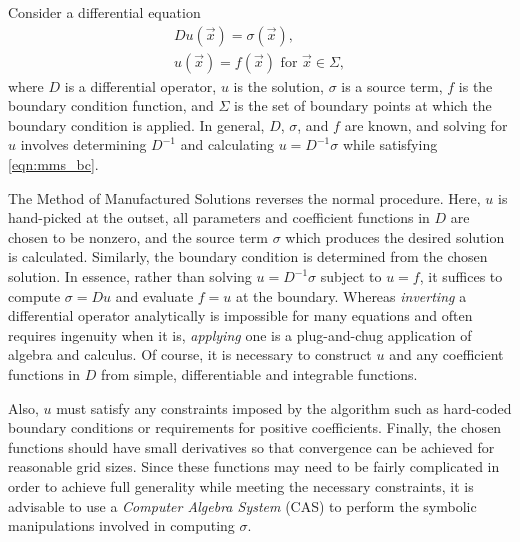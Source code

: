 Consider a differential equation
\begin{align}
  Du(\vec{x}) = \sigma(\vec{x}), \label{eqn:mms_de} \\
  u(\vec{x})=f(\vec{x}) \mbox{ for } \vec{x} \in \Sigma,
  \label{eqn:mms_bc}
\end{align}
where $D$ is a differential operator, $u$ is the solution, $\sigma$ is a source term, $f$ is the boundary condition function, and $\Sigma$ is the set of boundary points at which the boundary condition is applied.
In general, $D$, $\sigma$, and $f$ are known, and solving for $u$ involves determining $D^{-1}$ and calculating $u = D^{-1}\sigma$ while satisfying \eqref{eqn:mms_bc}.

The Method of Manufactured Solutions reverses the normal procedure.
Here, $u$ is hand-picked at the outset, all parameters and coefficient functions in $D$ are chosen to be nonzero, and the source term $\sigma$ which produces the desired solution is calculated.
Similarly, the boundary condition is determined from the chosen solution.
In essence, rather than solving $u = D^{-1}\sigma$ subject to $u=f$, it suffices to compute $\sigma = Du$ and evaluate $f=u$ at the boundary.
Whereas \textit{inverting} a differential operator analytically is impossible for many equations and often requires ingenuity when it is, \textit{applying} one is a plug-and-chug application of algebra and calculus.
Of course, it is necessary to construct $u$ and any coefficient functions in $D$ from simple, differentiable and integrable functions.

Also, $u$ must satisfy any constraints imposed by the algorithm such as hard-coded boundary conditions or requirements for positive coefficients.
Finally, the chosen functions should have small derivatives so that convergence can be achieved for reasonable grid sizes.
Since these functions may need to be fairly complicated in order to achieve full generality while meeting the necessary constraints, it is advisable to use a \textit{Computer Algebra System} (CAS) to perform the symbolic manipulations involved in computing $\sigma$.

